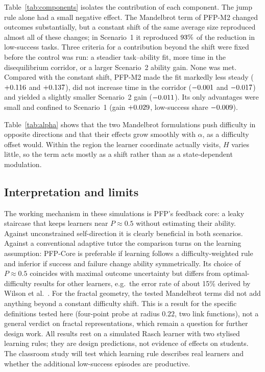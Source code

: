 Table~\ref{tab:components} isolates the contribution of each component. The jump rule alone had a small negative effect. The Mandelbrot term of PFP-M2 changed outcomes substantially, but a constant shift of the same average size reproduced almost all of these changes; in Scenario~1 it reproduced $93\%$ of the reduction in low-success tasks. Three criteria for a contribution beyond the shift were fixed before the control was run: a steadier task--ability fit, more time in the disequilibrium corridor, or a larger Scenario~2 ability gain. None was met. Compared with the constant shift, PFP-M2 made the fit markedly less steady ($+0.116$ and $+0.137$), did not increase time in the corridor ($-0.001$ and $-0.017$) and yielded a slightly smaller Scenario~2 gain ($-0.011$). Its only advantages were small and confined to Scenario~1 (gain $+0.029$, low-success share $-0.009$).

\begin{table}[!t]
\centering
\caption{Sensitivity to the pre-specified weight $\alpha$ of the Mandelbrot term ($\alpha = 0$: PFP-Core for PFP-M1, PFP-Core+J for PFP-M2).}
\label{tab:alpha}
\resizebox{\columnwidth}{!}{}
\end{table}

Table~\ref{tab:alpha} shows that the two Mandelbrot formulations push difficulty in opposite directions and that their effects grow smoothly with $\alpha$, as a difficulty offset would. Within the region the learner coordinate actually visits, $H$ varies little, so the term acts mostly as a shift rather than as a state-dependent modulation.

\subsection{Interpretation and limits}
The working mechanism in these simulations is PFP's feedback core: a leaky staircase that keeps learners near $P \approx 0.5$ without estimating their ability. Against unconstrained self-direction it is clearly beneficial in both scenarios. Against a conventional adaptive tutor the comparison turns on the learning assumption: PFP-Core is preferable if learning follows a difficulty-weighted rule and inferior if success and failure change ability symmetrically. Its choice of $P \approx 0.5$ coincides with maximal outcome uncertainty but differs from optimal-difficulty results for other learners, e.g.\ the error rate of about 15\% derived by Wilson et al.\ \cite{wilson2019eighty}. For the fractal geometry, the tested Mandelbrot terms did not add anything beyond a constant difficulty shift. This is a result for the specific definitions tested here (four-point probe at radius $0.22$, two link functions), not a general verdict on fractal representations, which remain a question for further design work. All results rest on a simulated Rasch learner with two stylised learning rules; they are design predictions, not evidence of effects on students. The classroom study will test which learning rule describes real learners and whether the additional low-success episodes are productive.
